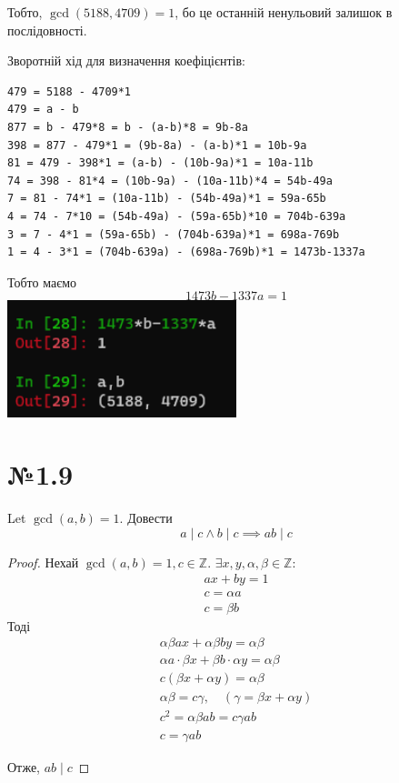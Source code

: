 \documentclass[11pt, a4paper]{article} %
\newcommand{\Z}{\mathbb{Z}}
\begin{document}
Тобто, $\gcd(5188,4709) = 1$, бо це останній ненульовий залишок в послідовності.

Зворотній хід для визначення коефіцієнтів:
\begin{lstlisting}
479 = 5188 - 4709*1
479 = a - b
877 = b - 479*8 = b - (a-b)*8 = 9b-8a
398 = 877 - 479*1 = (9b-8a) - (a-b)*1 = 10b-9a
81 = 479 - 398*1 = (a-b) - (10b-9a)*1 = 10a-11b
74 = 398 - 81*4 = (10b-9a) - (10a-11b)*4 = 54b-49a
7 = 81 - 74*1 = (10a-11b) - (54b-49a)*1 = 59a-65b
4 = 74 - 7*10 = (54b-49a) - (59a-65b)*10 = 704b-639a
3 = 7 - 4*1 = (59a-65b) - (704b-639a)*1 = 698a-769b
1 = 4 - 3*1 = (704b-639a) - (698a-769b)*1 = 1473b-1337a
\end{lstlisting}

Тобто маємо
\[1473b-1337a=1\]
\includegraphics[width=0.5\textwidth]{gcd1.png}

\newpage
\section*{№1.9}
\begin{mdframed}
    Let $\gcd(a,b)=1$.
    Довести
    \[a\mid c \land b\mid c \implies ab\mid c\]
\end{mdframed}

\begin{proof}
    Нехай $\gcd(a,b) = 1, c\in\Z$. $\exists x,y,\alpha,\beta\in\Z:$
    \begin{gather*}
        ax+by=1\\
        c=\alpha a\\
        c=\beta b
    \end{gather*}
    Тоді
    \begin{gather*}
        \alpha\beta ax + \alpha\beta by = \alpha\beta\\
        \alpha a\cdot \beta x + \beta b \cdot \alpha y = \alpha\beta\\
        c(\beta x + \alpha y) = \alpha\beta\\
        \alpha\beta = c\gamma, \quad (\gamma = \beta x + \alpha y)\\
        c^2 = \alpha\beta ab = c \gamma ab\\
        c = \gamma ab
    \end{gather*}

    Отже, $ab\mid c$

\end{proof}
\end{document}
